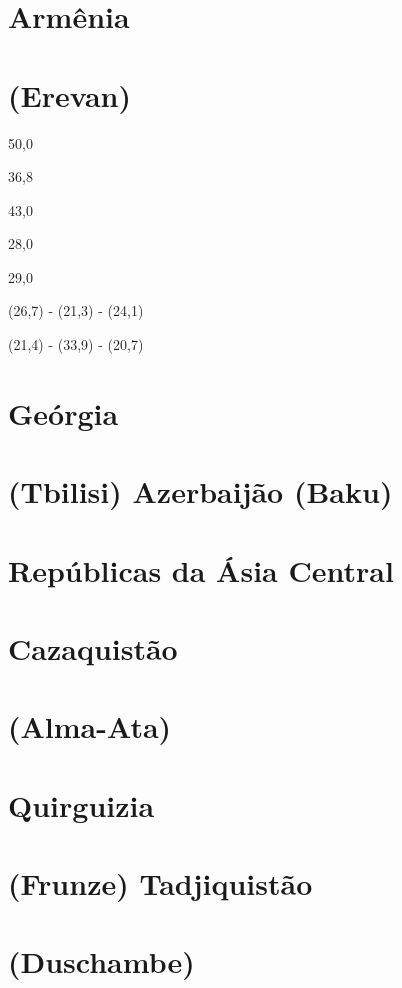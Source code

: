 {{{\section{Armênia}
 \par 
\section{(Erevan)}
 \par 
50,0
 \par 
36,8
 \par 
43,0
 \par 
28,0
 \par 
29,0
 \par 
(26,7) - (21,3) - (24,1)
 \par 
(21,4) - (33,9) - (20,7)
 \par 
\section{Geórgia}
 \par 
\section{(Tbilisi) Azerbaijão (Baku)}
 \par 
\section{Repúblicas da Ásia Central}
 \par 
\section{Cazaquistão}
 \par 
\section{(Alma-Ata)}
 \par 
\section{Quirguizia}
 \par 
\section{(Frunze) Tadjiquistão}
 \par 
\section{(Duschambe)}
 \par 
}}}
